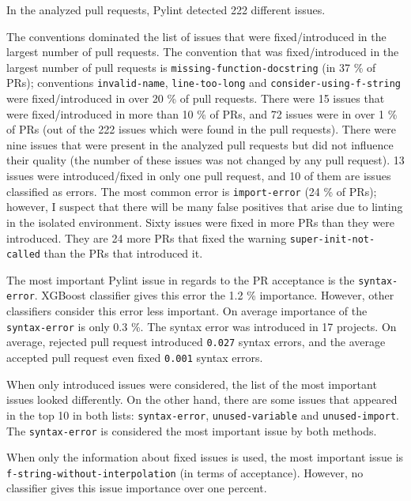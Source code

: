 \documentclass[digital,oneside,oldtable,nolof,nolot,nocover]{fithesis4}
\begin{document}
In the analyzed pull requests, Pylint detected 222 different issues.

The conventions dominated the list of issues that were fixed/introduced in
the largest number of pull requests.  The convention that was
fixed/introduced in the largest number of pull requests is
\texttt{missing-function-docstring} (in 37 \% of PRs); conventions
\texttt{invalid-name}, \texttt{line-too-long} and \texttt{consider-using-f-string} were
fixed/introduced in over 20 \% of pull requests. There were 15 issues
that were fixed/introduced in more than 10 \% of PRs, and 72 issues were in
over 1 \% of PRs (out of the 222 issues which were found in the pull
requests).  There were nine issues that were present in the analyzed pull
requests but did not influence their quality (the number of these issues was not
changed by any pull request). 13 issues were introduced/fixed in only one
pull request, and 10 of them are issues classified as errors. The most common
error is \texttt{import-error} (24 \% of PRs); however, I suspect that there will be
many false positives that arise due to linting in the isolated
environment. Sixty issues were fixed in more PRs than they were introduced.
They are 24 more PRs that fixed the warning \texttt{super-init-not-called} than the
PRs that introduced it.

The most important Pylint issue in regards to the PR acceptance is the
\texttt{syntax-error}.  XGBoost classifier gives this error the 1.2 \%
importance. However, other classifiers consider this error less important.
On average importance of the \texttt{syntax-error} is only 0.3 \%.  The syntax error
was introduced in 17 projects. On average, rejected pull request introduced
\texttt{0.027} syntax errors, and the average accepted pull request even fixed \texttt{0.001}
syntax errors.

When only introduced issues were considered, the list
of the most important issues looked differently. On the other hand, there
are some issues that appeared in the top 10 in both lists: \texttt{syntax-error},
\texttt{unused-variable} and \texttt{unused-import}. The \texttt{syntax-error} is considered
the most important issue by both methods.

When only the information about fixed issues is used, the most important issue
is \texttt{f-string-without-interpolation} (in terms of acceptance). However, no classifier
gives this issue importance over one percent.
\end{document}

